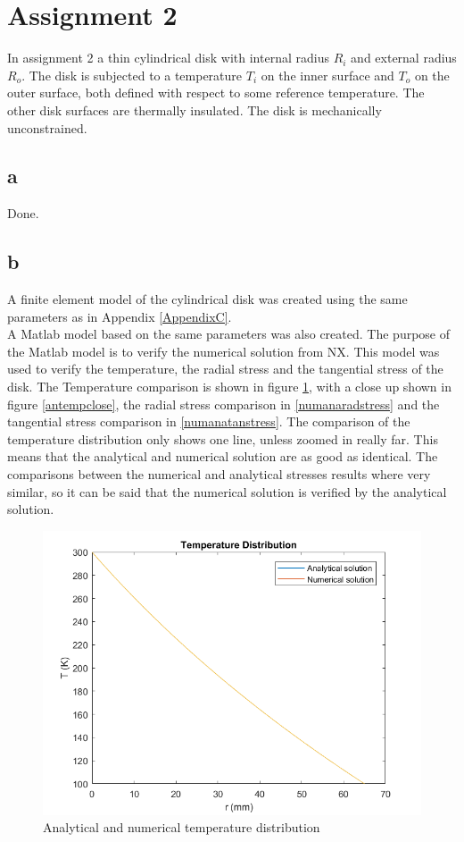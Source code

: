 \clearpage
\section{Assignment 2}
\label{AppendixB}

In assignment 2 a thin cylindrical disk with internal radius $R_i$ and external radius $R_o$. The disk is subjected to a temperature $T_i$ on the inner surface and $T_o$ on the outer surface, both defined with respect to some reference temperature. The other disk surfaces are thermally insulated. The disk is mechanically unconstrained.

\subsection{a}

Done.

\subsection{b}

A finite element model of the cylindrical disk was created using the same parameters as in Appendix \ref{AppendixC}.\\
A Matlab model based on the same parameters was also created. The purpose of the Matlab model is to verify the numerical solution from NX. This model was used to verify the temperature, the radial stress and the tangential stress of the disk. The Temperature comparison is shown in figure \ref{antemp}, with a close up shown in figure \ref{antempclose}, the radial stress comparison in \ref{numanaradstress} and the tangential stress comparison in \ref{numanatanstress}. The comparison of the temperature distribution only shows one line, unless zoomed in really far. This means that the analytical and numerical solution are as good as identical. The comparisons between the numerical and analytical stresses results where very similar, so it can be said that the numerical solution is verified by the analytical solution.  


\begin{figure} [H]
	\centering
	\includegraphics[width=0.8\linewidth]{Figures/tempereture_distribution_disk.png}
	\caption{Analytical and numerical temperature distribution}
    \label{antemp}
\end{figure}

